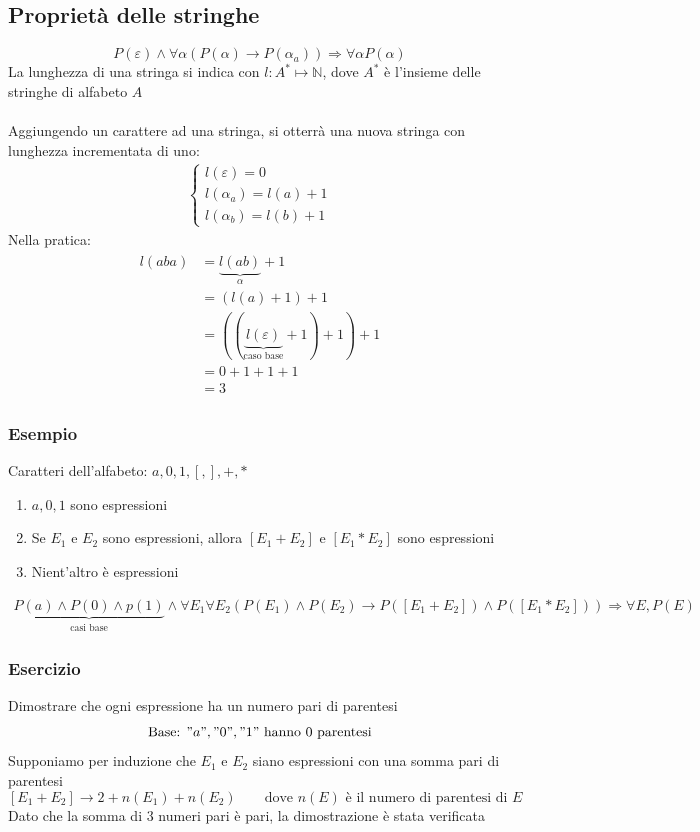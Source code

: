 \documentclass[italian]{article}
\begin{document}
\subsection{Proprietà delle stringhe}
\[
	P(\varepsilon) \land \forall\alpha(P(\alpha)\to P(\alpha_a)) \Rightarrow \forall\alpha P(\alpha)
\]
La lunghezza di una stringa si indica con $l: A^* \longmapsto \mathbb{N}$, dove $A^*$ è l'insieme delle stringhe di alfabeto $A$\\\\
Aggiungendo un carattere ad una stringa, si otterrà una nuova stringa con lunghezza incrementata di uno:
\begin{gather*}
	\begin{cases*}
		l(\varepsilon) = 0 \\
		l(\alpha_a) = l(a) + 1 \\
		l(\alpha_b) = l(b) + 1
	\end{cases*}
\end{gather*}
Nella pratica:
\begin{gather*}
	\begin{split}
		l(aba) &= \underbrace{l(ab)}_{\alpha} + 1 \\
		&= (l(a)+1)+1 \\
		&= ((\underbrace{l(\varepsilon)}_{\text{caso base}}+1)+1)+1 \\
		&= 0 + 1 + 1 + 1 \\
		&= 3
	\end{split}
\end{gather*}
\subsubsection{Esempio}
Caratteri dell'alfabeto: $a,0,1,[,],+,*$
\begin{enumerate}
	\item $a,0,1$ sono espressioni
	\item Se $E_1$ e $E_2$ sono espressioni, allora $[E_1 + E_2]$ e $[E_1 * E_2]$ sono espressioni
	\item Nient'altro è espressioni
\end{enumerate}
\begin{gather*}
	\underbrace{P(a) \land P(0) \land p(1)}_{\text{casi base}} \land \forall E_1 \forall E_2 (P(E_1) \land P(E_2) \to P\left([E_1 + E_2]\right) \land P\left([E_1 * E_2]\right)) \Rightarrow \forall E,P(E)
\end{gather*}
\pagebreak
\subsubsection{Esercizio}
Dimostrare che ogni espressione ha un numero pari di parentesi
\[
	\text{Base: } "a", "0", "1" \text{ hanno 0 parentesi}
\]
Supponiamo per induzione che $E_1$ e $E_2$ siano espressioni con una somma pari di parentesi
\[
	[E_1 + E_2] \to 2 + n(E_1) + n(E_2) \qquad \text{dove $n(E)$ è il numero di parentesi di $E$}
\]
Dato che la somma di 3 numeri pari è pari, la dimostrazione è stata verificata
\end{document}
